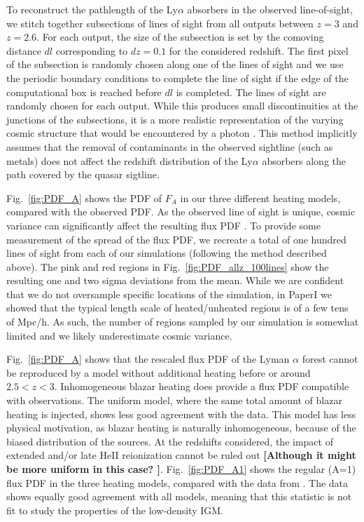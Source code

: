 \documentclass[numberedappendix]{emulateapj}
\newcommand\ALc[1]{{\color{red} \bf #1}} %
\begin{document}
To reconstruct the pathlength of the Ly$\alpha$ absorbers in the  observed line-of-sight, we stitch together subsections of lines of sight from all outputs between $z=3$ and $z=2.6$. For each output, the size of the subsection is set by the comoving distance $dl$ corresponding to $dz=0.1$ for the considered redshift. The first pixel of the subsection is randomly chosen along one  of the lines of sight and we use the periodic boundary conditions to complete the line of sight if the edge of the computational box is reached before $dl$ is completed. The lines of sight are randomly chosen for each output. While this produces small discontinuities at the junctions of the subsections, it is a more realistic representation of the varying cosmic structure that would be encountered by a photon \citep[see e.g.][for a discussion]{2016arXiv161203935H}. This method implicitly assumes that the removal of contaminants in the observed sightline (such as metals) does not affect the redshift distribution of the Ly$\alpha$ absorbers along the path covered by  the quasar sigtline.

Fig.~\ref{fig:PDF_A} shows the PDF of $F_A$ in our three different heating models, compared with the observed PDF.  As the observed line of sight is unique, cosmic variance can significantly affect the resulting flux PDF \citep{2013MNRAS.428..540R,2017MNRAS.466.2690R}. To provide some measurement of the spread of the flux PDF, we recreate a total of one hundred  lines of sight from each of our simulations (following the method described above). The pink and red regions in Fig.~\ref{fig:PDF_allz_100lines} show the resulting one and two sigma deviations from the mean. While we are confident that we do not oversample specific locations of the simulation, in PaperI we showed that the typical length scale  of heated/unheated regions is of a few tens of Mpc/h. As such, the number of regions sampled by our simulation is somewhat limited and we likely underestimate cosmic variance. 


Fig.~\ref{fig:PDF_A} shows that the rescaled flux PDF of the Lyman $\alpha$ forest cannot be reproduced by a model without additional heating before or around $2.5<z<3$. Inhomogeneous blazar heating does provide a flux PDF compatible with observations. The uniform model, where the same total amount of blazar heating is injected, shows less good agreement with the data. This model has less physical motivation, as blazar heating is naturally inhomogeneous, because of the biased distribution of the sources.  At the redshifts considered, the impact of extended and/or late HeII reionization cannot be ruled out \ALc{[Although it might be more uniform in this case? ]}.  Fig.~\ref{fig:PDF_A1} shows the regular (A=1)  flux PDF in the three heating models, compared with the data from \citet{2013MNRAS.428..540R}. The data shows equally good agreement with all models, meaning that this statistic is not fit to study the properties of the low-density IGM.
\end{document}
